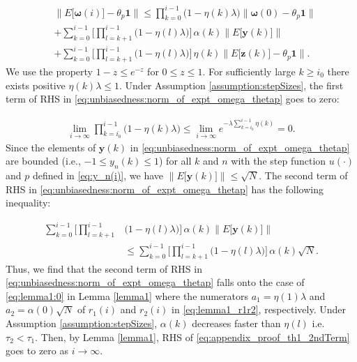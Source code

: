 \documentclass[journal]{IEEEtran}
\begin{document}
\vspace{-4mm}
\small
\begin{align}
&\Big\|E\big[\bm{\omega}(i)\big] - \theta_p \mathbf{1} \Big\| \le \prod_{k=0}^{i-1}\Big(1 - \eta(k)\lambda\Big) \Big\|\bm{\omega}(0) - \theta_p\mathbf{1}\Big\| \nonumber \\
&+\sum_{k=0}^{i-1}\Bigg[\prod_{l=k+1}^{i-1} \Big(1 - \eta(l)\lambda \Big)\Bigg]\, \alpha(k) \Big\|E\big[\mathbf{y}(k)\big]\Big\| \nonumber \\
&+\sum_{k=0}^{i-1}\Bigg[\prod_{l=k+1}^{i-1} \Big(1 - \eta(l)\lambda \Big)\Bigg]\, \eta(k) \Big\| E\big[\mathbf{z}(k)\big] - \theta_p\mathbf{1}\Big\|. \label{eq:unbiasedness:norm_of_expt_omega_thetap}
\end{align}
\normalsize 
We use the property $1-z \le e^{-z}$ for $0 \le z \le 1$. For sufficiently large $k\ge i_0$ there exists positive $\eta(k)\lambda \le 1$. Under Assumption \ref{assumption:stepSizes}, the first term of RHS in \eqref{eq:unbiasedness:norm_of_expt_omega_thetap} goes to zero:

\vspace{-4mm}
\small
\begin{align}
\lim_{i\to\infty}\prod_{k=i_0}^{i-1}\Big(1 - \eta(k) \lambda\Big) \le \lim_{i \to \infty} e^{-\lambda \sum_{k=i_0}^{i-1} \eta(k)} 	= 0.  \label{eq:unbiasedness:1-eta_lambda_goesto_zero}
\end{align}
\normalsize
Since {}{the elements of} $\mathbf{y}(k)$ in \eqref{eq:unbiasedness:norm_of_expt_omega_thetap} are bounded {}{(i.e., $-1 \le {y}_n(k) \le 1$) for all $k$ and $n$} with the step function $u(\cdot)$ and $p$ defined in \eqref{eq:y_n(i)}, we have $\big\|E\big[\mathbf{y}(k)\big]\big\| \le \sqrt{N}$. The second term of RHS in \eqref{eq:unbiasedness:norm_of_expt_omega_thetap} has the following inequality:

\vspace{-4mm}
\small
\begin{align}
\sum_{k=0}^{i-1}\Bigg[\prod_{l=k+1}^{i-1} &\Big(1 - \eta(l)\lambda \Big)\Bigg]\, \alpha(k) \Big\|E\big[\mathbf{y}(k)\big]\Big\| \nonumber \\
&\le \sum_{k=0}^{i-1}\Bigg[\prod_{l=k+1}^{i-1} \Big(1 - \eta(l)\lambda \Big)\Bigg]\, \alpha(k) \sqrt{N}. \label{eq:appendix_proof_th1_2ndTerm}
\end{align}
\normalsize
Thus, we find that the second term of RHS in \eqref{eq:unbiasedness:norm_of_expt_omega_thetap} falls onto the case of \eqref{eq:lemma1:0} in Lemma \ref{lemma1} where the numerators $a_1 = \eta(1)\lambda$ and $a_2 = \alpha(0)\sqrt{N}$ of $r_1(i)$ and $r_2(i)$ in \eqref{eq:lemma1_r1r2}, respectively. {}{Under Assumption \ref{assumption:stepSizes}, $\alpha(k)$ decreases faster than $\eta(l)$ i.e. $\tau_2 < \tau_1$. Then, by Lemma \ref{lemma1}, RHS of \eqref{eq:appendix_proof_th1_2ndTerm}} goes to zero as $i\to\infty$. 
\end{document}
